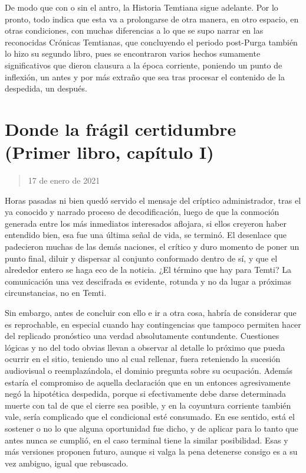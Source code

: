 \documentclass[
]{book}
\begin{document}
De modo que con o sin el antro, la Historia Temtiana sigue adelante. Por lo pronto, todo indica que esta va a prolongarse de otra manera, en otro espacio, en otras condiciones, con muchas diferencias a lo que se supo narrar en las reconocidas Crónicas Temtianas, que concluyendo el periodo post-Purga también lo hizo su segundo libro, pues se encontraron varios hechos sumamente significativos que dieron clausura a la época corriente, poniendo un punto de inflexión, un antes y por más extraño que sea tras procesar el contenido de la despedida, un después.

\hypertarget{donde-la-fruxe1gil-certidumbre-primer-libro-capuxedtulo-i}{%
\section{Donde la frágil certidumbre (Primer libro, capítulo I)}\label{donde-la-fruxe1gil-certidumbre-primer-libro-capuxedtulo-i}}

\begin{quote}
17 de enero de 2021
\end{quote}

Horas pasadas ni bien quedó servido el mensaje del críptico administrador, tras el ya conocido y narrado proceso de decodificación, luego de que la conmoción generada entre los más inmediatos interesados aflojara, si ellos creyeron haber entendido bien, esa fue una última señal de vida, se terminó. El desenlace que padecieron muchas de las demás naciones, el crítico y duro momento de poner un punto final, diluir y dispersar al conjunto conformado dentro de sí, y que el alrededor entero se haga eco de la noticia. ¿El término que hay para Temti? La comunicación una vez descifrada es evidente, rotunda y no da lugar a próximas circunstancias, no en Temti.

Sin embargo, antes de concluir con ello e ir a otra cosa, habría de considerar que es reprochable, en especial cuando hay contingencias que tampoco permiten hacer del replicado pronóstico una verdad absolutamente contundente. Cuestiones lógicas y no del todo obvias llevan a observar al detalle lo próximo que pueda ocurrir en el sitio, teniendo uno al cual rellenar, fuera reteniendo la sucesión audiovisual o reemplazándola, el dominio pregunta sobre su ocupación. Además estaría el compromiso de aquella declaración que en un entonces agresivamente negó la hipotética despedida, porque si efectivamente debe darse determinada muerte con tal de que el cierre sea posible, y en la coyuntura corriente también vale, sería complicado que el condicional esté consumado. En ese sentido, está el sostener o no lo que alguna oportunidad fue dicho, y de aplicar para lo tanto que antes nunca se cumplió, en el caso terminal tiene la similar posibilidad. Esas y más versiones proponen futuro, aunque si valga la pena detenerse consigo es a su vez ambiguo, igual que rebuscado.
\end{document}
